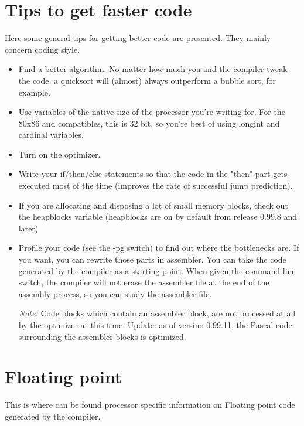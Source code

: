 \documentclass{report}
\begin{document}
\section{Tips to get faster code}
Here some general tips for getting better code are presented. They
mainly concern coding style.

\begin{itemize}
\item Find a better algorithm. No matter how much you and the compiler
tweak the code, a quicksort will (almost) always outperform a bubble
sort, for example.

\item Use variables of the native size of the processor you're writing
for. For the 80x86 and compatibles, this is 32 bit, so you're best of
using longint and cardinal variables.

\item Turn on the optimizer.

\item Write your if/then/else statements so that the code in the "then"-part
gets executed most of the time (improves the rate of successful jump prediction).

\item If you are allocating and disposing a lot of small memory blocks,
check out the heapblocks variable (heapblocks are on by default from
release 0.99.8 and later)

\item Profile your code (see the -pg switch) to find out where the
bottlenecks are. If you want, you can rewrite those parts in assembler.
You can take the code generated by the compiler as a starting point. When
given the  command-line switch, the compiler will not erase the
assembler file at the end of the assembly process, so you can study the
assembler file.

{\em Note:} Code blocks which contain an assembler block, are not processed
at all by the optimizer at this time. Update: as of versino 0.99.11, the Pascal
code surrounding the assembler blocks is optimized.
\end{itemize}

\section{ Floating point }

This is where can be found processor specific information on Floating
point code generated by the compiler.
\end{document}
